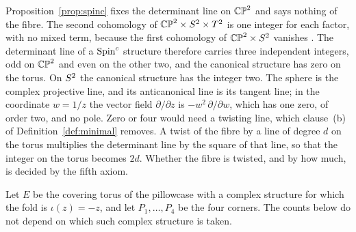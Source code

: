 \documentclass[11pt,a4paper]{article}
\theoremstyle{plain}
\theoremstyle{definition}
\theoremstyle{remark}
\begin{document}
Proposition~\ref{prop:spinc} fixes the determinant line on $\mathbb{CP}^2$ and says nothing of the fibre. The second cohomology of $\mathbb{CP}^2\times S^2\times T^2$ is one integer for each factor, with no mixed term, because the first cohomology of $\mathbb{CP}^2\times S^2$ vanishes \cite{Hatcher}. The determinant line of a $\text{Spin}^c$ structure therefore carries three independent integers, odd on $\mathbb{CP}^2$ and even on the other two, and the canonical structure has zero on the torus. On $S^2$ the canonical structure has the integer two. The sphere is the complex projective line, and its anticanonical line is its tangent line; in the coordinate $w=1/z$ the vector field $\partial/\partial z$ is $-w^{2}\,\partial/\partial w$, which has one zero, of order two, and no pole. Zero or four would need a twisting line, which clause~(b) of Definition~\ref{def:minimal} removes. A twist of the fibre by a line of degree $d$ on the torus multiplies the determinant line by the square of that line, so that the integer on the torus becomes $2d$. Whether the fibre is twisted, and by how much, is decided by the fifth axiom.

Let $E$ be the covering torus of the pillowcase with a complex structure for which the fold is $\iota(z)=-z$, and let $P_{1},\dots,P_{4}$ be the four corners. The counts below do not depend on which such complex structure is taken.
\end{document}
